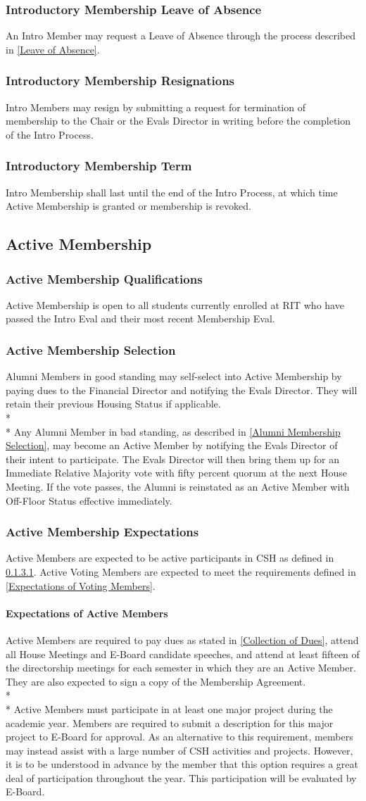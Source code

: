 \documentclass{article}
\newcommand{\asection}[1]{\subsection{#1} \label{#1}}
\newcommand{\asubsection}[1]{\subsubsection{#1} \label{#1}}
\newcommand{\asubsubsection}[1]{\paragraph{#1} \label{#1}}
\begin{document}
\asubsection{Introductory Membership Leave of Absence}
An Intro Member may request a Leave of Absence through the process described in \ref{Leave of Absence}.

\asubsection{Introductory Membership Resignations}
Intro Members may resign by submitting a request for termination of membership to the Chair or the Evals Director in writing before the completion of the Intro Process.

\asubsection{Introductory Membership Term}
Intro Membership shall last until the end of the Intro Process, at which time Active Membership is granted or membership is revoked.

\asection{Active Membership}

\asubsection{Active Membership Qualifications}
Active Membership is open to all students currently enrolled at RIT who have passed the Intro Eval and their most recent Membership Eval.

\asubsection{Active Membership Selection}
Alumni Members in good standing may self-select into Active Membership by paying dues to the Financial Director and notifying the Evals Director. They will retain their previous Housing Status if applicable.
\\*\\*
Any Alumni Member in bad standing, as described in \ref{Alumni Membership Selection}, may become an Active Member by notifying the Evals Director of their intent to participate.
The Evals Director will then bring them up for an Immediate Relative Majority vote with fifty percent quorum at the next House Meeting.
If the vote passes, the Alumni is reinstated as an Active Member with Off-Floor Status effective immediately.

\asubsection{Active Membership Expectations}
Active Members are expected to be active participants in CSH as defined in \ref{Expectations of Active Members}.
Active Voting Members are expected to meet the requirements defined in \ref{Expectations of Voting Members}.

\asubsubsection{Expectations of Active Members}
Active Members are required to pay dues as stated in \ref{Collection of Dues}, attend all House Meetings and E-Board candidate speeches, and attend at least fifteen of the directorship meetings for each semester in which they are an Active Member.
They are also expected to sign a copy of the Membership Agreement.
\\* \\*
Active Members must participate in at least one major project during the academic year.
Members are required to submit a description for this major project to E-Board for approval.
As an alternative to this requirement, members may instead assist with a large number of CSH activities and projects.
However, it is to be understood in advance by the member that this option requires a great deal of participation throughout the year.
This participation will be evaluated by E-Board.
\end{document}
